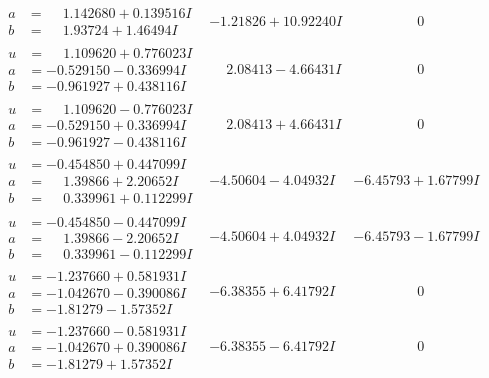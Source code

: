 \documentclass[1p]{elsarticle_modified}
\theoremstyle{definition}
\begin{document}
$$\begin{array}{c|c|c}
\begin{aligned}
a &= \phantom{-}1.142680 + 0.139516 I \\
b &= \phantom{-}1.93724 + 1.46494 I\end{aligned}
 & -1.21826 + 10.92240 I & \phantom{-0.000000 } 0 \\ \hline\begin{aligned}
u &= \phantom{-}1.109620 + 0.776023 I \\
a &= -0.529150 - 0.336994 I \\
b &= -0.961927 + 0.438116 I\end{aligned}
 & \phantom{-}2.08413 - 4.66431 I & \phantom{-0.000000 } 0 \\ \hline\begin{aligned}
u &= \phantom{-}1.109620 - 0.776023 I \\
a &= -0.529150 + 0.336994 I \\
b &= -0.961927 - 0.438116 I\end{aligned}
 & \phantom{-}2.08413 + 4.66431 I & \phantom{-0.000000 } 0 \\ \hline\begin{aligned}
u &= -0.454850 + 0.447099 I \\
a &= \phantom{-}1.39866 + 2.20652 I \\
b &= \phantom{-}0.339961 + 0.112299 I\end{aligned}
 & -4.50604 - 4.04932 I & -6.45793 + 1.67799 I \\ \hline\begin{aligned}
u &= -0.454850 - 0.447099 I \\
a &= \phantom{-}1.39866 - 2.20652 I \\
b &= \phantom{-}0.339961 - 0.112299 I\end{aligned}
 & -4.50604 + 4.04932 I & -6.45793 - 1.67799 I \\ \hline\begin{aligned}
u &= -1.237660 + 0.581931 I \\
a &= -1.042670 - 0.390086 I \\
b &= -1.81279 - 1.57352 I\end{aligned}
 & -6.38355 + 6.41792 I & \phantom{-0.000000 } 0 \\ \hline\begin{aligned}
u &= -1.237660 - 0.581931 I \\
a &= -1.042670 + 0.390086 I \\
b &= -1.81279 + 1.57352 I\end{aligned}
 & -6.38355 - 6.41792 I & \phantom{-0.000000 } 0 \\ \hline\begin{aligned}

\end{aligned}
\end{array}$$
\end{document}
